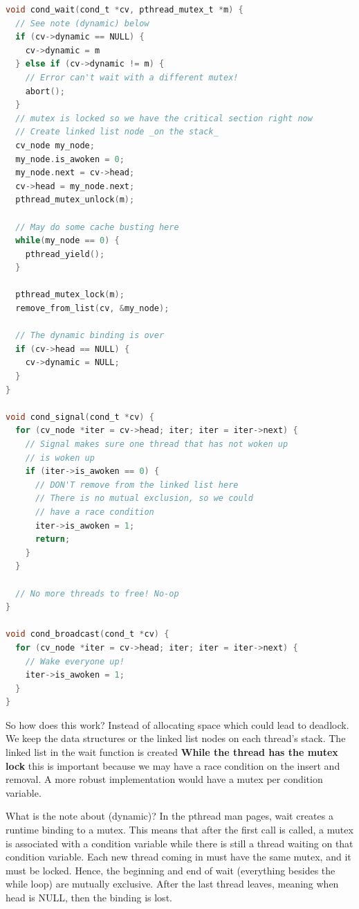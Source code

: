 \begin{lstlisting}[language=C]
void cond_wait(cond_t *cv, pthread_mutex_t *m) {
  // See note (dynamic) below
  if (cv->dynamic == NULL) {
    cv->dynamic = m
  } else if (cv->dynamic != m) {
    // Error can't wait with a different mutex!
    abort();
  }
  // mutex is locked so we have the critical section right now
  // Create linked list node _on the stack_
  cv_node my_node;
  my_node.is_awoken = 0;
  my_node.next = cv->head;
  cv->head = my_node.next;
  pthread_mutex_unlock(m);

  // May do some cache busting here
  while(my_node == 0) {
    pthread_yield();
  }

  pthread_mutex_lock(m);
  remove_from_list(cv, &my_node);

  // The dynamic binding is over
  if (cv->head == NULL) {
    cv->dynamic = NULL;
  }
}

void cond_signal(cond_t *cv) {
  for (cv_node *iter = cv->head; iter; iter = iter->next) {
    // Signal makes sure one thread that has not woken up
    // is woken up
    if (iter->is_awoken == 0) {
      // DON'T remove from the linked list here
      // There is no mutual exclusion, so we could
      // have a race condition
      iter->is_awoken = 1;
      return;
    }
  }

  // No more threads to free! No-op
}

void cond_broadcast(cond_t *cv) {
  for (cv_node *iter = cv->head; iter; iter = iter->next) {
    // Wake everyone up!
    iter->is_awoken = 1;
  }
}
\end{lstlisting}

So how does this work?
Instead of allocating space which could lead to deadlock.
We keep the data structures or the linked list nodes on each thread's stack.
The linked list in the wait function is created \textbf{While the thread has the mutex lock} this is important because we may have a race condition on the insert and removal.
A more robust implementation would have a mutex per condition variable.

What is the note about (dynamic)?
In the pthread man pages, wait creates a runtime binding to a mutex. This means that after the first call is called, a mutex is associated with a condition variable while there is still a thread waiting on that condition variable.
Each new thread coming in must have the same mutex, and it must be locked.
Hence, the beginning and end of wait (everything besides the while loop) are mutually exclusive.
After the last thread leaves, meaning when head is NULL, then the binding is lost.

